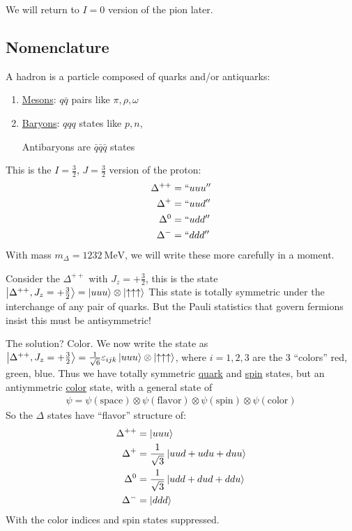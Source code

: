 We will return to $I=0$ version of the pion later.

\subsection{Nomenclature}
\begin{definition}[Hadron]
  A hadron is a particle composed of quarks and/or antiquarks:
  \begin{enumerate}[label=(\alph*)]
  \item \underline{Mesons}: $q\bar{q}$ pairs like $\pi,\rho,\omega$
  \item \underline{Baryons}: $qqq$ states like $p,n$,

    Antibaryons are $\bar{q}\bar{q}\bar{q}$ states
  \end{enumerate}
\end{definition}

\begin{definition}
  This is the $I=\frac32$, $J=\frac32$ version of the proton:
  \begin{align*}
    \Delta^{++}&=``uuu''\\
    \Delta^{+ }&=``uud''\\
    \Delta^{0 }&=``udd''\\
    \Delta^{- }&=``ddd''
  \end{align*}
  With mass $m_\Delta=\SI{1232}{\MeV}$, we will write these more carefully in a moment.
\end{definition}
Consider the $\Delta^{++}$ with $J_z=+\frac32$, this is the state $\ket{\Delta^{++},J_z=+\frac32}=\ket{uuu}\otimes\ket{\uparrow\uparrow\uparrow}$
This state is totally symmetric under the interchange of any pair of quarks. But the Pauli statistics that govern fermions insist this must be antisymmetric!

The solution? Color. We now write the state as $\ket{\Delta^{++},J_z=+\frac32}=\frac1{\sqrt{6}}\varepsilon_{ijk}\ket{uuu}\otimes\ket{\uparrow\uparrow\uparrow}$, where $i=1,2,3$ are the 3 ``colors'' red, green, blue. Thus we have totally symmetric \underline{quark} and \underline{spin} states, but an antiymmetric \underline{color} state, with a general state of
\begin{align*}
  \psi=\psi(\text{space})\otimes
  \psi(\text{flavor})\otimes
  \psi(\text{spin})\otimes
  \psi(\text{color})
\end{align*}
So the $\Delta$ states have ``flavor'' structure of:
\begin{align*}
  \Delta^{++}&=\ket{uuu}\\
  \Delta^{+ }&=\frac1{\sqrt{3}}\ket{uud+udu+duu}\\
  \Delta^{0 }&=\frac1{\sqrt{3}}\ket{udd+dud+ddu}\\
  \Delta^{- }&=\ket{ddd}
\end{align*}
With the color indices and spin states suppressed.

